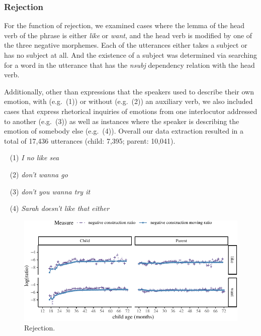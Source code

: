 \documentclass[10pt, letterpaper]{article}
\newenvironment{CodeChunk}{}{}
\begin{document}
\hypertarget{rejection}{%
\subsubsection{Rejection}\label{rejection}}

For the function of rejection, we examined cases where the lemma of the
head verb of the phrase is either \emph{like} or \emph{want}, and the
head verb is modified by one of the three negative morphemes. Each of
the utterances either takes a subject or has no subject at all. And the
existence of a subject was determined via searching for a word in the
utterance that has the \emph{nsubj} dependency relation with the head
verb.

Additionally, other than expressions that the speakers used to describe
their own emotion, with (e.g.~(1)) or without (e.g.~(2)) an auxiliary
verb, we also included cases that express rhetorical inquiries of
emotions from one interlocutor addressed to another (e.g.~(3)) as well
as instances where the speaker is describing the emotion of somebody
else (e.g.~(4)). Overall our data extraction resulted in a total of
17,436 utterances (child: 7,395; parent: 10,041).

~ (1) \emph{I no like sea}

~ (2) \emph{don't wanna go}

~ (3) \emph{don't you wanna try it}

~ (4) \emph{Sarah doesn't like that either}

\begin{figure}[h]

\begin{CodeChunk}


\begin{center}\includegraphics{figs/emotion-1} \end{center}

\end{CodeChunk}
\caption[This image spans both columns]{Rejection.}\label{fig:rejection}
\end{figure}
\end{document}
